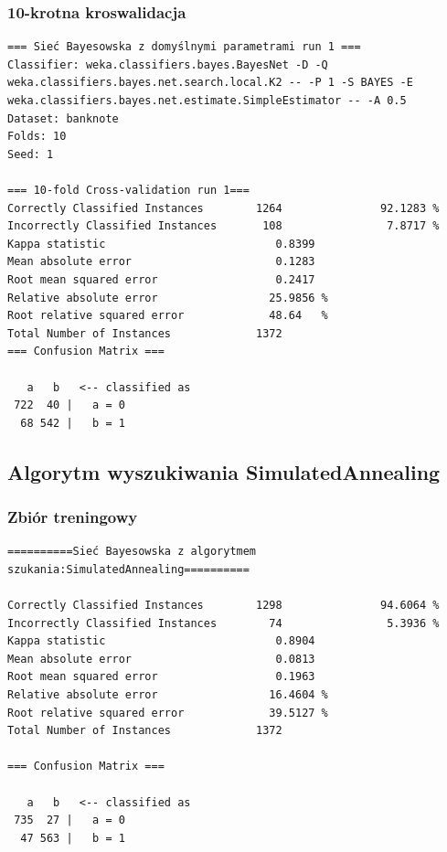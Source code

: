 \documentclass{classrep}
\begin{document}
\subsubsection*{10-krotna kroswalidacja}
\scriptsize 
\begin{verbatim}
=== Sieć Bayesowska z domyślnymi parametrami run 1 ===
Classifier: weka.classifiers.bayes.BayesNet -D -Q
weka.classifiers.bayes.net.search.local.K2 -- -P 1 -S BAYES -E
weka.classifiers.bayes.net.estimate.SimpleEstimator -- -A 0.5
Dataset: banknote
Folds: 10
Seed: 1

=== 10-fold Cross-validation run 1===
Correctly Classified Instances        1264               92.1283 %
Incorrectly Classified Instances       108                7.8717 %
Kappa statistic                          0.8399
Mean absolute error                      0.1283
Root mean squared error                  0.2417
Relative absolute error                 25.9856 %
Root relative squared error             48.64   %
Total Number of Instances             1372     
=== Confusion Matrix ===

   a   b   <-- classified as
 722  40 |   a = 0
  68 542 |   b = 1
\end{verbatim} 
\normalsize

\subsection{Algorytm wyszukiwania SimulatedAnnealing}
\subsubsection*{Zbiór treningowy}
\scriptsize 
\begin{verbatim}
==========Sieć Bayesowska z algorytmem szukania:SimulatedAnnealing==========

Correctly Classified Instances        1298               94.6064 %
Incorrectly Classified Instances        74                5.3936 %
Kappa statistic                          0.8904
Mean absolute error                      0.0813
Root mean squared error                  0.1963
Relative absolute error                 16.4604 %
Root relative squared error             39.5127 %
Total Number of Instances             1372     

=== Confusion Matrix ===

   a   b   <-- classified as
 735  27 |   a = 0
  47 563 |   b = 1
\end{verbatim} 
\normalsize
\end{document}
